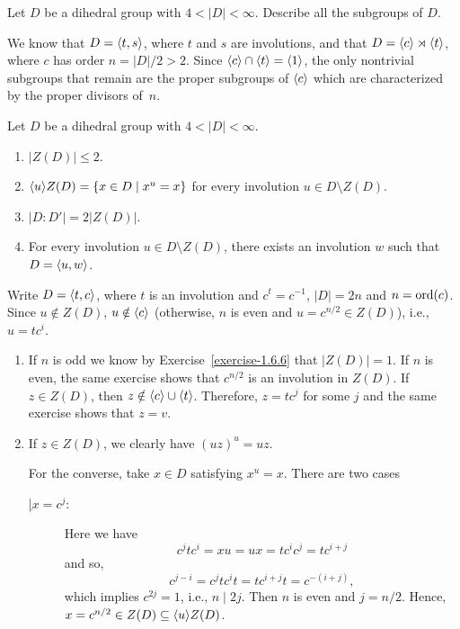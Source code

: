 \begin{solution}
\newpage

\begin{exr}
    Let\/ $D$ be a dihedral group with\/ $4<|D|<\infty$. Describe all the subgroups of\/ $D$.
\end{exr}

\begin{solution} We know that $D=\langle t,s\rangle$, where $t$ and $s$ are involutions, and that $D=\langle c\rangle\rtimes\langle t\rangle$, where $c$ has order $n=|D|/2>2$. Since $\langle c\rangle\cap\langle t\rangle=\langle1\rangle$, the only nontrivial subgroups that remain are the proper subgroups of $\langle c\rangle$ which are characterized by the proper divisors of~$n$.  \end{solution}

\begin{exr}\label{exercise-1.6.9}
    Let\/ $D$ be a dihedral group with\/ $4<|D|<\infty$. 
    \begin{enumerate}[\rm a)]
    \item $|Z(D)| \leq 2$.
    \item $\langle u\rangle Z(D) = \{x \in D \mid x^u = x\}$ for every involution\/ $u \in D \setminus Z(D)$.
    \item $|D:D'| = 2|Z(D)|$.
    \item For every involution\/ $u\in D\setminus Z(D)$, there exists an involution\/ $w$ such that\/ $D = \langle u,w\rangle$.
    \end{enumerate}
\end{exr}

\begin{solution} Write $D=\langle t,c\rangle$, where $t$ is an involution and $c^t=c^{-1}$, $|D|=2n$ and $n={\rm ord}(c)$. Since $u\notin Z(D)$, $u\notin\langle c\rangle$ (otherwise, $n$ is even and $u=c^{n/2}\in Z(D)$), i.e., $u=tc^i$.
\begin{enumerate}[\rm a)]
    \item If $n$ is odd we know by Exercise~\ref{exercise-1.6.6} that $|Z(D)|=1$. If $n$ is even, the same exercise shows that $c^{n/2}$ is an involution in $Z(D)$. If $z\in Z(D)$, then $z\notin\langle c\rangle\cup\langle t\rangle$. Therefore, $z=tc^j$ for some $j$ and the same exercise shows that $z=v$.
    \item If $z\in Z(D)$, we clearly have $(uz)^u=uz$.
    
    For the converse, take $x\in D$ satisfying $x^u=x$. There are two cases

    \begin{description}
        \item[\rm\underline{\vphantom|$x=c^j$}:] Here we have
    $$
        c^jtc^i=xu=ux=tc^ic^j=tc^{i+j}
    $$
    and so,
    $$
        c^{j-i}=c^jtc^it = tc^{i+j}t=c^{-(i+j)},
    $$
    which implies $c^{2j}=1$, i.e., $n\mid 2j$. Then $n$ is even and $j=n/2$. Hence, $x=c^{n/2}\in Z(D)\subseteq\langle u\rangle Z(D)$.


\end{description}
\end{enumerate}
\end{solution}
\end{solution}
